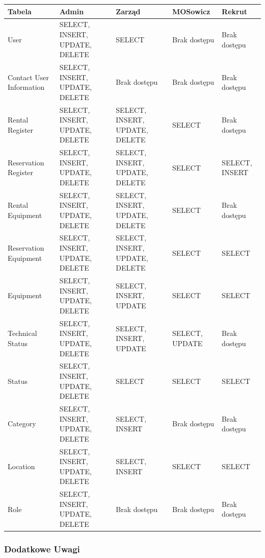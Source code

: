 \documentclass{article}
\begin{document}
\begin{table}[!htbp]
\centering
    \begin{tabular}{|p{2cm}|p{2cm}|p{2cm}|p{2cm}|p{2cm}|}
        \hline
        \textbf{Tabela} & \textbf{Admin} & \textbf{Zarząd} & \textbf{MOSowicz} & \textbf{Rekrut} \\
        \hline
        User & SELECT, INSERT, UPDATE, DELETE & SELECT & Brak dostępu & Brak dostępu \\
        \hline
        Contact User Information & SELECT, INSERT, UPDATE, DELETE & Brak dostępu & Brak dostępu & Brak dostępu \\
        \hline
        Rental Register & SELECT, INSERT, UPDATE, DELETE & SELECT, INSERT, UPDATE, DELETE & SELECT & Brak dostępu \\
        \hline
        Reservation Register & SELECT, INSERT, UPDATE, DELETE & SELECT, INSERT, UPDATE, DELETE & SELECT & SELECT, INSERT \\
        \hline
        Rental Equipment & SELECT, INSERT, UPDATE, DELETE & SELECT, INSERT, UPDATE, DELETE & SELECT & Brak dostępu \\
        \hline
        Reservation Equipment & SELECT, INSERT, UPDATE, DELETE & SELECT, INSERT, UPDATE, DELETE & SELECT & SELECT \\
        \hline
        Equipment & SELECT, INSERT, UPDATE, DELETE & SELECT, INSERT, UPDATE & SELECT & SELECT \\
        \hline
        Technical Status & SELECT, INSERT, UPDATE, DELETE & SELECT, INSERT, UPDATE & SELECT, UPDATE & Brak dostępu \\
        \hline
        Status & SELECT, INSERT, UPDATE, DELETE & SELECT & SELECT & SELECT \\
        \hline
        Category & SELECT, INSERT, UPDATE, DELETE & SELECT, INSERT & Brak dostępu & Brak dostępu \\
        \hline
        Location & SELECT, INSERT, UPDATE, DELETE & SELECT, INSERT & SELECT & SELECT \\
        \hline
        Role & SELECT, INSERT, UPDATE, DELETE & Brak dostępu & Brak dostępu & Brak dostępu \\
        \hline
    \end{tabular}
\end{table}

\subsubsection{Dodatkowe Uwagi}
\end{document}
